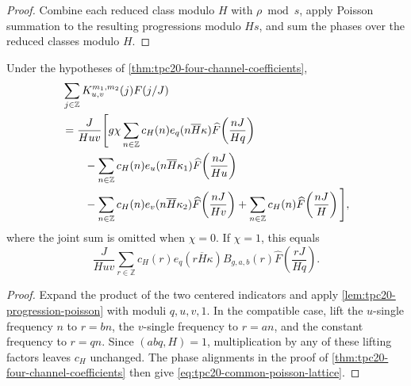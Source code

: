 \begin{proof}
Combine each reduced class modulo \(H\) with \(\rho\bmod s\), apply
Poisson summation to the resulting progressions modulo \(Hs\), and sum
the phases over the reduced classes modulo \(H\).
\end{proof}

\begin{corollary}
\label{cor:tpc20-four-poisson-lattices}
Under the hypotheses of \cref{thm:tpc20-four-channel-coefficients},
\begin{align}
 &\sum_{j\in\mathbb Z}K_{u,v}^{m_1,m_2}(j)F(j/J)
 \notag\\
 &=\frac{J}{Huv}\Bigg[
 g\chi\sum_{n\in\mathbb Z}c_H(n)e_q(n\overline H\kappa)
      \widehat F\!\left(\frac{nJ}{Hq}\right)
 \notag\\
 &\qquad-\sum_{n\in\mathbb Z}c_H(n)e_u(n\overline H\kappa_1)
      \widehat F\!\left(\frac{nJ}{Hu}\right)
 \notag\\
 &\qquad-\sum_{n\in\mathbb Z}c_H(n)e_v(n\overline H\kappa_2)
      \widehat F\!\left(\frac{nJ}{Hv}\right)
 +\sum_{n\in\mathbb Z}c_H(n)
      \widehat F\!\left(\frac{nJ}{H}\right)
 \Bigg],
 \label{eq:tpc20-four-poisson-lattices}
\end{align}
where the joint sum is omitted when \(\chi=0\).  If \(\chi=1\), this
equals
\begin{equation}
 \boxed{
 \frac{J}{Huv}\sum_{r\in\mathbb Z}
 c_H(r)e_q(r\overline H\kappa)B_{g,a,b}(r)
 \widehat F\!\left(\frac{rJ}{Hq}\right).}
 \label{eq:tpc20-common-poisson-lattice}
\end{equation}
\end{corollary}

\begin{proof}
Expand the product of the two centered indicators and apply
\cref{lem:tpc20-progression-poisson} with moduli \(q,u,v,1\).  In the
compatible case, lift the \(u\)-single frequency \(n\) to \(r=bn\), the
\(v\)-single frequency to \(r=an\), and the constant frequency to
\(r=qn\).  Since \((abq,H)=1\), multiplication by any of these lifting
factors leaves \(c_H\) unchanged.  The phase alignments in the proof of
\cref{thm:tpc20-four-channel-coefficients} then give
\eqref{eq:tpc20-common-poisson-lattice}.
\end{proof}

